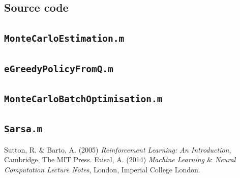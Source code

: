\documentclass[10pt]{article}   	%
\begin{document}
\begin{appendices}
  \renewcommand\thetable{\thesection\arabic{table}}
  \renewcommand\thefigure{\thesection\arabic{figure}}
  \section{Source code} \label{app:newFunct}
  \subsection{\texttt{MonteCarloEstimation.m}}
  \begin{framed}
  
  \end{framed}
  \subsection{\texttt{eGreedyPolicyFromQ.m}}
  \begin{framed}
  
  \end{framed}
  \subsection{\texttt{MonteCarloBatchOptimisation.m}}
  \begin{framed}
  
  \end{framed}
   \subsection{\texttt{Sarsa.m}}
  \begin{framed}
  
  \end{framed}
\end{appendices}

\begin{thebibliography}{9}

  Sutton, R. $\&$ Barto, A. (2005) \textit{Reinforcement Learning: An Introduction}, Cambridge, The MIT Press. 
  Faisal, A. (2014) \textit{Machine Learning $\&$ Neural Computation Lecture Notes}, London, Imperial College London. 
\end{thebibliography}
\end{document}

